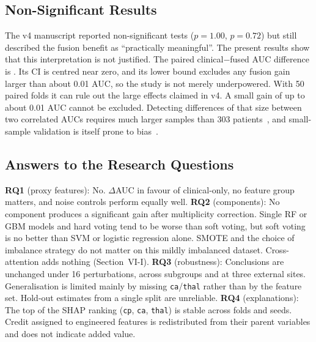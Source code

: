 \subsection{Non-Significant Results}
The v4 manuscript reported non-significant tests ($p=1.00$, $p=0.72$) but still described the fusion benefit as ``practically meaningful''. The present results show that this interpretation is not justified. The paired clinical$-$fused AUC difference is \dClinAUC{}. Its CI is centred near zero, and its lower bound excludes any fusion gain larger than about 0.01 AUC, so the study is not merely underpowered. With 50 paired folds it can rule out the large effects claimed in v4. A small gain of up to about 0.01 AUC cannot be excluded. Detecting differences of that size between two correlated AUCs requires much larger samples than 303 patients~\cite{hanley1983}, and small-sample validation is itself prone to bias~\cite{vabalas2019}.

\subsection{Answers to the Research Questions}
\textbf{RQ1} (proxy features): No. $\Delta$AUC \dClinAUC{} in favour of clinical-only, no feature group matters, and noise controls perform equally well.
\textbf{RQ2} (components): No component produces a significant gain after multiplicity correction. Single RF or GBM models and hard voting tend to be worse than soft voting, but soft voting is no better than SVM or logistic regression alone. SMOTE and the choice of imbalance strategy do not matter on this mildly imbalanced dataset. Cross-attention adds nothing (Section~VI-I).
\textbf{RQ3} (robustness): Conclusions are unchanged under 16 perturbations, across subgroups and at three external sites. Generalisation is limited mainly by missing \texttt{ca}/\texttt{thal} rather than by the feature set. Hold-out estimates from a single split are unreliable.
\textbf{RQ4} (explanations): The top of the SHAP ranking (\texttt{cp}, \texttt{ca}, \texttt{thal}) is stable across folds and seeds. Credit assigned to engineered features is redistributed from their parent variables and does not indicate added value.

